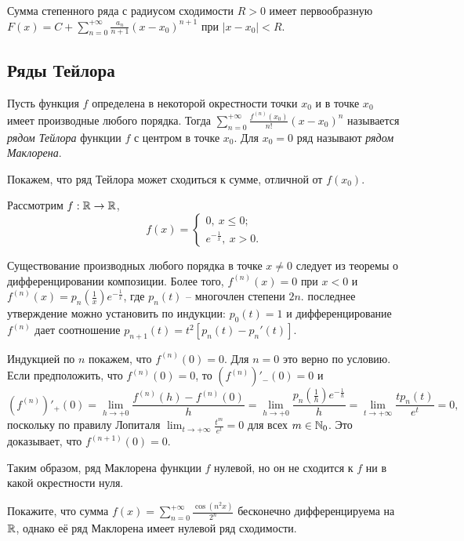 \begin{corollary}
    \label{cor2-power-series}
    Сумма степенного ряда с радиусом сходимости $R > 0$ имеет первообразную $F(x) = C + \sum_{n = 0}^{+\infty} \frac{a_{n}}{n + 1}(x - x_{0})^{n + 1}$ при $|x - x_{0}| < R$.
\end{corollary}

\subsection{Ряды Тейлора}

\begin{definition}
    Пусть функция $f$ определена в некоторой окрестности точки $x_{0}$ и в точке $x_{0}$ имеет производные любого порядка. Тогда $\sum_{n = 0}^{+\infty} \frac{f^{(n)}(x_{0})}{n!}(x - x_{0})^{n}$ называется \textit{рядом Тейлора} функции $f$ с центром в точке $x_{0}$. Для $x_{0} = 0$ ряд называют \textit{рядом Маклорена}.
\end{definition}

Покажем, что ряд Тейлора может сходиться к сумме, отличной от $f(x_{0})$.

\begin{example}
    Рассмотрим $f: \mathbb{R} \to \mathbb{R}$, 
    \[f(x) = \begin{cases}
        0, \ x \leq 0; \\
        e^{- \frac{1}{x}}, \ x > 0.
    \end{cases}\]
    
    Существование производных любого порядка в точке $x \neq 0$ следует из теоремы о дифференцировании композиции. Более того, $f^{(n)}(x) = 0$ при $x < 0$ и $f^{(n)}(x) = p_{n}(\frac{1}{x})e^{-\frac{1}{x}}$, где $p_{n}(t)$ -- многочлен степени $2n$. последнее утверждение можно установить по индукции: $p_{0}(t) = 1$ и дифференцирование $f^{(n)}$ дает соотношение $p_{n + 1}(t) = t^{2} [p_{n}(t) - p_{n}'(t)]$.

    Индукцией по $n$ покажем, что $f^{(n)}(0) = 0$. Для $n = 0$ это верно по условию. Если предположить, что $f^{(n)}(0) = 0$, то $(f^{(n)})'_{-}(0) = 0$ и
    \[(f^{(n)})'_{+}(0) = \lim_{h \to +0} \frac{f^{(n)}(h) - f^{(n)}(0)}{h} = \lim_{h \to +0}\frac{p_{n}(\frac{1}{h})e^{-\frac{1}{h}}}{h} = \lim_{t \to +\infty} \frac{t p_{n}(t)}{e^{t}} = 0,\]
    поскольку по правилу Лопиталя $\lim_{t \to +\infty} \frac{t^{m}}{e^{t}} = 0$ для всех $m \in \mathbb{N}_{0}$. Это доказывает, что $f^{(n + 1)}(0) = 0$.

    Таким образом, ряд Маклорена функции $f$ нулевой, но он не сходится к $f$ ни в какой окрестности нуля.
\end{example}

\begin{problem}
    Покажите, что сумма $f(x) = \sum_{n = 0}^{+\infty} \frac{\cos(n^{2}x)}{2^{n}}$ бесконечно дифференцируема на $\mathbb{R}$, однако её ряд Маклорена имеет нулевой ряд сходимости.
\end{problem}